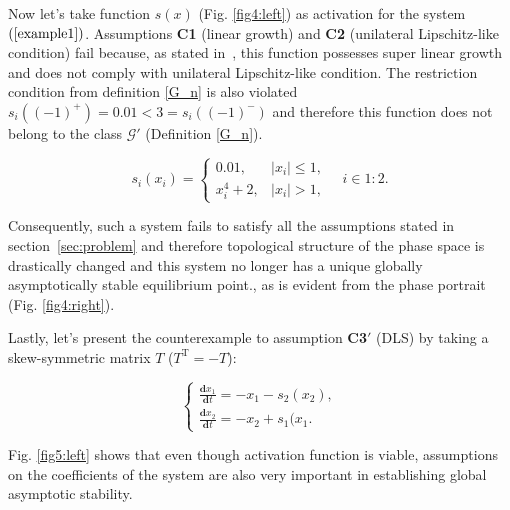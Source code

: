 \documentclass[journal]{IEEEtran}
\begin{document}


Now let’s take function $s(x)$ (Fig. \ref{fig4:left}) as activation for the system $(\ref{example1})$. Assumptions \textbf{C1} (linear growth) and \textbf{C2} (unilateral Lipschitz-like condition) fail because, as stated in~\cite{unilateral_Lipschitz_like_condition}, this function possesses super linear growth and does not comply with unilateral Lipschitz-like condition. The restriction condition from definition \ref{G_n} is also violated $s_i((-1)^+) = 0.01 < 3 = s_i((-1)^-)$ and therefore this function does not belong to the class $\mathcal{G'}$ (Definition \ref{G_n}). 

\begin{equation*}
    s_i(x_i) = \begin{cases} 0.01, & |x_i| \leqslant 1, \\ 
    x_i^4+2, & 
    |x_i| > 1, \end{cases} \quad i\in 1:2.
\end{equation*}


Consequently, such a system fails to satisfy all the assumptions stated in section~\ref{sec:problem} and therefore topological structure of the phase space is drastically changed and this system no longer has a unique globally asymptotically stable equilibrium point., as is evident from the phase portrait (Fig. \ref{fig4:right}).

Lastly, let's present the counterexample to assumption \textbf{C3$'$} (DLS) by taking a skew-symmetric matrix $T$ ($T^{\mathrm{T}} = -T$):

\begin{equation}\label{example2}
\begin{cases}\frac{\mathbf{d}x_1}{\mathbf{d}{t}}=-x_1- s_2(x_2),\\\frac{\mathbf{d}x_2}{\mathbf{d}{t}}=-x_2 + s_1(x_1.\end{cases}
\end{equation}

Fig. \ref{fig5:left} shows that even though activation function is viable, assumptions on the coefficients of the system are also very important in establishing global asymptotic stability.
\end{document}
